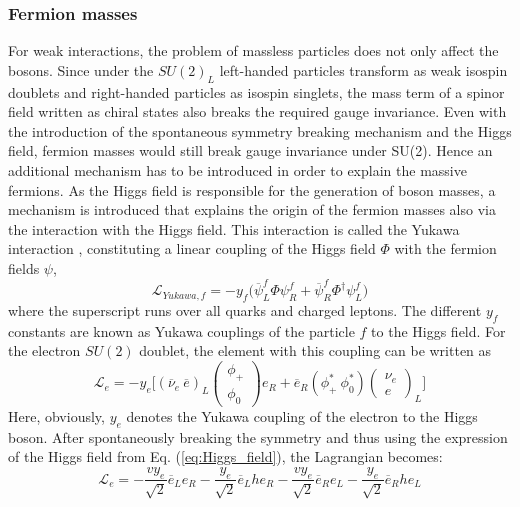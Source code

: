 \subsubsection{\label{subsec:intro_masses}Fermion masses}%
\noindent For weak interactions, the problem of massless particles does not only affect the bosons. Since under the $SU (2)_L$ left-handed particles transform as weak isospin doublets and right-handed particles as isospin singlets, the mass term of a spinor field written as chiral states also breaks the required gauge invariance. Even with the introduction of the spontaneous symmetry breaking mechanism and the Higgs field, fermion masses would still break gauge invariance under SU(2). Hence an additional mechanism has to be introduced in order to explain the massive fermions. As the Higgs field is responsible for the generation of boson masses, a mechanism is introduced that explains the origin of the fermion masses also via the interaction with the Higgs field. This interaction is called the Yukawa interaction \cite{Yukawa}, constituting a linear coupling of the Higgs field $\Phi$ with the fermion fields $\psi$,
\begin{equation}
    \mathscr{L}_{Yukawa, f} = - y_f \big( \overline{\psi}_L^f\Phi\psi_R^f + \overline{\psi}_R^f \Phi^{\dagger}\psi_L^f \big)
\end{equation}
where the superscript runs over all quarks and charged leptons. The different $y_f$ constants are known as Yukawa couplings of the particle $f$ to the Higgs field. For the electron $SU(2)$ doublet, the element with this coupling can be written as
\begin{equation}
    \mathscr{L}_e = -y_e\Bigg[(\overline{\nu}_e \: \overline{e})_L \begin{pmatrix}
        \phi_+ \\
        \phi_0
    \end{pmatrix} e_R + \overline{e}_R (\phi_+^* \: \phi_0^*) \begin{pmatrix}
        \nu_e \\ e
    \end{pmatrix}_L \Bigg]
\end{equation}
Here, obviously, $y_e$ denotes the Yukawa coupling of the electron to the Higgs boson. After spontaneously breaking the symmetry and thus using the expression of the Higgs field from Eq. (\ref{eq:Higgs_field}), the Lagrangian becomes:
\begin{equation} \label{eq:Yukawa_Lagrangian}
    \mathscr{L}_e = -\frac{vy_e}{\sqrt{2}}\overline{e}_Le_R -\frac{y_e}{\sqrt{2}}\overline{e}_Lhe_R -\frac{vy_e}{\sqrt{2}}\overline{e}_Re_L -\frac{y_e}{\sqrt{2}}\overline{e}_Rhe_L
\end{equation}
